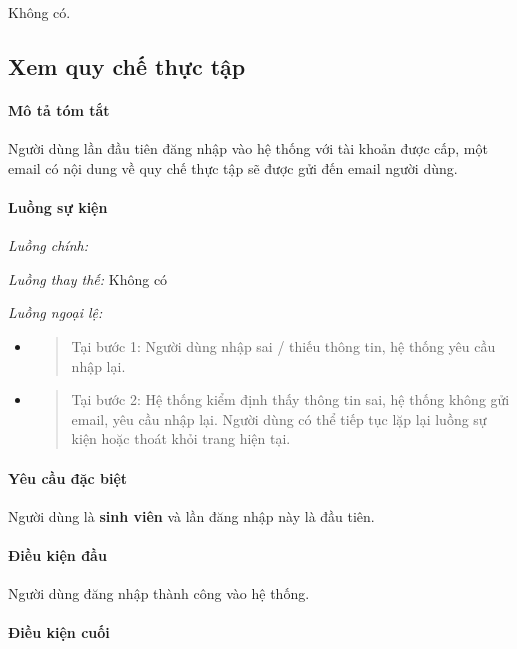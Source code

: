 \documentclass[./../main.tex]{subfiles}
\begin{document}
Không có.

\subsection{Xem quy chế thực tập}

\paragraph*{Mô tả tóm tắt}

Người dùng lần đầu tiên đăng nhập vào hệ thống với tài khoản được cấp,
một email có nội dung về quy chế thực tập sẽ được gửi đến email người
dùng.

\paragraph*{Luồng sự kiện}

\emph{Luồng chính:}

\emph{Luồng thay thế:} Không có

\emph{Luồng ngoại lệ:}

\begin{itemize}
\item
  \begin{quote}
  Tại bước 1: Người dùng nhập sai / thiếu thông tin, hệ thống yêu cầu
  nhập lại.
  \end{quote}
\item
  \begin{quote}
  Tại bước 2: Hệ thống kiểm định thấy thông tin sai, hệ thống không gửi
  email, yêu cầu nhập lại. Người dùng có thể tiếp tục lặp lại luồng sự
  kiện hoặc thoát khỏi trang hiện tại.
  \end{quote}
\end{itemize}

\paragraph*{Yêu cầu đặc biệt}

Người dùng là \textbf{sinh viên} và lần đăng nhập này là đầu tiên.

\paragraph*{Điều kiện đầu}

Người dùng đăng nhập thành công vào hệ thống.

\paragraph*{Điều kiện cuối}
\end{document}
